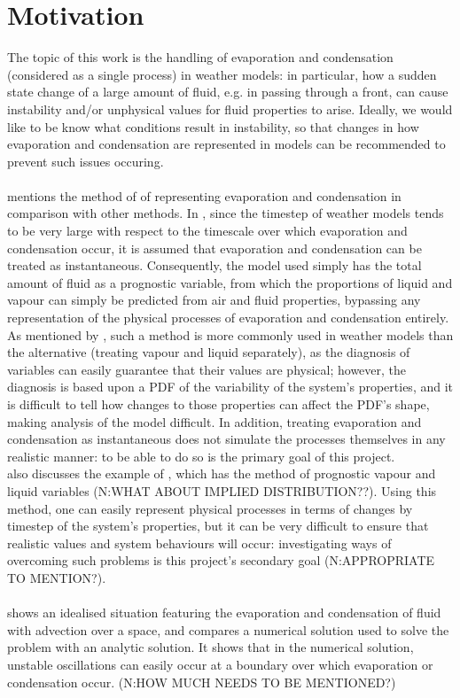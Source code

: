 \documentclass[11pt]{article}
\begin{document}
\section{Motivation}
The topic of this work is the handling of evaporation and condensation (considered as a single process) in weather models: in particular, how a sudden state change of a large amount of fluid, e.g. in passing through a front, can cause instability and/or unphysical values for fluid properties to arise. Ideally, we would like to be know what conditions result in instability, so that changes in how evaporation and condensation are represented in models can be recommended to prevent such issues occuring. \\
~\\
\citet[p.~2095]{Wilson2008} mentions the method of \citet{Smith1990} of representing evaporation and condensation in comparison with other methods. In \citeauthor{Smith1990}, since the timestep of weather models tends to be very large with respect to the timescale over which evaporation and condensation occur, it is assumed that evaporation and condensation can be treated as instantaneous. Consequently, the model used simply has the total amount of fluid as a prognostic variable, from which the proportions of liquid and vapour can simply be predicted from air and fluid properties, bypassing any representation of the physical processes of evaporation and condensation entirely.
As mentioned by \citeauthor{Wilson2008}, such a method is more commonly used in weather models than the alternative (treating vapour and liquid separately), as the diagnosis of variables can easily guarantee that their values are physical; however, the diagnosis is based upon a PDF of the variability of the system's properties, and it is difficult to tell how changes to those properties can affect the PDF's shape, making analysis of the model difficult. In addition, treating evaporation and condensation as instantaneous does not simulate the processes themselves in any realistic manner: to be able to do so is the primary goal of this project. \\
\citeauthor{Wilson2008} also discusses the example of \citet{Tiedtke1993}, which has the method of prognostic vapour and liquid variables (N:WHAT ABOUT IMPLIED DISTRIBUTION??). Using this method, one can easily represent physical processes in terms of changes by timestep of the system's properties, but it can be very difficult to ensure that realistic values and system behaviours will occur: investigating ways of overcoming such problems is this project's secondary goal (N:APPROPRIATE TO MENTION?). \\
~\\
\citet{GS1990} shows an idealised situation featuring the evaporation and condensation of fluid with advection over a space, and compares a numerical solution used to solve the problem with an analytic solution. It shows that in the numerical solution, unstable oscillations can easily occur at a boundary over which evaporation or condensation occur. (N:HOW MUCH NEEDS TO BE MENTIONED?) \\
\end{document}
